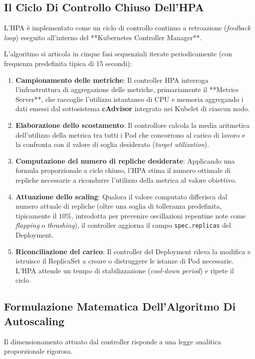 \documentclass[11pt, a4paper]{article}
\begin{document}
\subsection{Il Ciclo Di Controllo Chiuso Dell'HPA}
L'HPA è implementato come un ciclo di controllo continuo a retroazione (\emph{feedback loop}) eseguito all'interno del **Kubernetes Controller Manager**.


L'algoritmo si articola in cinque fasi sequenziali iterate periodicamente (con frequenza predefinita tipica di 15 secondi):
\begin{enumerate}
    \item \textbf{Campionamento delle metriche}: Il controller HPA interroga l'infrastruttura di aggregazione delle metriche, primariamente il **Metrics Server**, che raccoglie l'utilizzo istantaneo di CPU e memoria aggregando i dati emessi dal sottosistema \textbf{cAdvisor} integrato nei Kubelet di ciascun nodo.
    \item \textbf{Elaborazione dello scostamento}: Il controllore calcola la media aritmetica dell'utilizzo della metrica tra tutti i Pod che concorrono al carico di lavoro e la confronta con il valore di soglia desiderato (\emph{target utilization}).
    \item \textbf{Computazione del numero di repliche desiderate}: Applicando una formula proporzionale a ciclo chiuso, l'HPA stima il numero ottimale di repliche necessarie a ricondurre l'utilizzo della metrica al valore obiettivo.
    \item \textbf{Attuazione dello scaling}: Qualora il valore computato differisca dal numero attuale di repliche (oltre una soglia di tolleranza predefinita, tipicamente il $10\%$, introdotta per prevenire oscillazioni repentine note come \emph{flapping} o \emph{thrashing}), il controller aggiorna il campo \texttt{spec.replicas} del Deployment.
    \item \textbf{Riconciliazione del carico}: Il controller del Deployment rileva la modifica e istruisce il ReplicaSet a creare o distruggere le istanze di Pod necessarie. L'HPA attende un tempo di stabilizzazione (\emph{cool-down period}) e ripete il ciclo.
\end{enumerate}

\subsection{Formulazione Matematica Dell'Algoritmo Di Autoscaling}
Il dimensionamento attuato dal controller risponde a una legge analitica proporzionale rigorosa.
\end{document}
